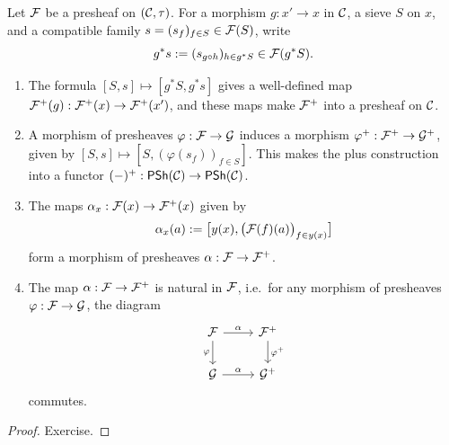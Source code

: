 \begin{proposition}\label{prop:chap:sheaves:sec:sites:plus construction is a presheaf}
    Let $\cal{F}$ be a presheaf on $(\catC,\tau)$. For a morphism $g : x' \to x$ in $\catC$, a sieve $S$ on $x$, and a compatible family $s = (s_f)_{f \in S} \in \cal{F}(S)$, write
    \[g^* s := (s_{g \circ h})_{h \in g^* S} \in \cal{F}(g^* S).\]
    \begin{enumerate}[label=(\alph*)]
        \item The formula $[S,s] \mapsto [g^* S, g^* s]$ gives a well-defined map $\cal{F}^+(g) : \cal{F}^+(x) \to \cal{F}^+(x')$, and these maps make $\cal{F}^+$ into a presheaf on $\catC$.
        \item A morphism of presheaves $\varphi : \cal{F} \to \cal{G}$ induces a morphism $\varphi^+ : \cal{F}^+ \to \cal{G}^+$, given by $[S,s] \mapsto [S, (\varphi(s_f))_{f \in S}]$. This makes the plus construction into a functor $(-)^+ : \PSh(\catC) \to \PSh(\catC)$.
        \item The maps $\alpha_x : \cal{F}(x) \to \cal{F}^+(x)$ given by
              \[\alpha_x(a) := \big[y(x), \big(\cal{F}(f)(a)\big)_{f \in y(x)}\big]\]
              form a morphism of presheaves $\alpha : \cal{F} \to \cal{F}^+$.
        \item The map $\alpha : \cal{F} \to \cal{F}^+$ is natural in $\cal{F}$, i.e.\ for any morphism of presheaves $\varphi : \cal{F} \to \cal{G}$, the diagram
              \[\begin{tikzcd}
                      \cal{F} \arrow[r,"\alpha"] \arrow[d,"\varphi"'] & \cal{F}^+ \arrow[d,"\varphi^+"] \\
                      \cal{G} \arrow[r,"\alpha"]                        & \cal{G}^+
                  \end{tikzcd}\]
              commutes.
    \end{enumerate}
\end{proposition}
\begin{proof}
    Exercise.
\end{proof}

